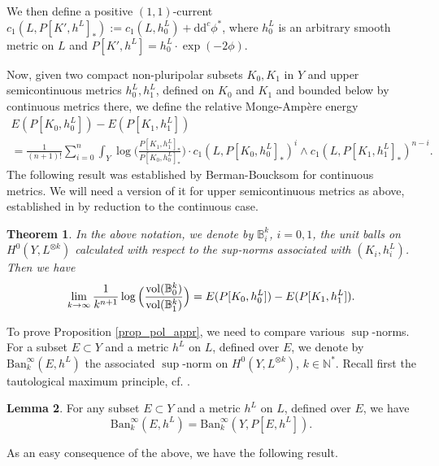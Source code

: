 \documentclass[12pt]{article}
\numberwithin{equation}{section}
\theoremstyle{theorem}
\newtheorem{thm}{Theorem}[section]
\theoremstyle{definition}
\newtheorem{lem}[thm]{Lemma}
\theoremstyle{remark}
\newcommand{\nat}{\mathbb{N}}
\newcommand{\ddc}{\mathrm{d} \mathrm{d}^c}
\begin{document}
	We then define a positive $(1, 1)$-current $c_1(L, P[K', h^L]_*) := c_1(L, h^L_0) + \ddc \phi^*$, where $h^L_0$ is an arbitrary smooth metric on $L$ and $P[K', h^L] = h^L_0 \cdot \exp(- 2 \phi)$.
	\par 
	Now, given two compact non-pluripolar subsets $K_0, K_1$ in $Y$ and upper semicontinuous metrics $h^L_0, h^L_1$, defined on $K_0$ and $K_1$ and bounded below by continuous metrics there, we define the relative Monge-Ampère energy
	\begin{multline}\label{eq_energy_proj}
		E(P[K_0, h^L_0]) - E(P[K_1, h^L_1])
		\\
		=
		\frac{1}{(n + 1)!}
		\sum_{i = 0}^{n} \int_Y \log \Big( \frac{P[K_1, h^L_1]_*}{P[K_0, h^L_0]_*} \Big)
		 \cdot c_1(L, P[K_0, h^L_0]_*)^i \wedge c_1(L, P[K_1, h^L_1]_*)^{n - i}.
	\end{multline}
	The following result was established by Berman-Boucksom \cite{BermanBouckBalls} for continuous metrics.
	We will need a version of it for upper semicontinuous metrics as above, established in \cite[Lemma 4.7]{FinKIDim} by reduction to the continuous case.
	\begin{thm}\label{thm_ber_bouck_balls}
		In the above notation, we denote by $\mathbb{B}^k_i$, $i = 0, 1$, the unit balls on $H^0(Y, L^{\otimes k})$ calculated with respect to the sup-norms associated with $(K_i, h^L_i)$.
		Then we have 
		\begin{equation}
			\lim_{k \to \infty} \frac{1}{k^{n + 1}}  \log \Big( \frac{{\rm{vol}}(\mathbb{B}^k_0)}{{\rm{vol}}(\mathbb{B}^k_1)} \Big)
			=
			E(P[K_0, h^L_0]) - E(P[K_1, h^L_1]).
		\end{equation}
	\end{thm}
	\par 
	To prove Proposition \ref{prop_pol_appr}, we need to compare various $\sup$-norms.
	For a subset $E \subset Y$ and a metric $h^L$ on $L$, defined over $E$, we denote by $\textrm{Ban}_k^{\infty}(E, h^L)$ the associated $\sup$-norm on $H^0(Y, L^{\otimes k})$, $k \in \nat^*$.
	Recall first the tautological maximum principle, cf. \cite[Proposition 1.8]{BermanBouckBalls}.
	\begin{lem}\label{lem_taut_max}
		For any subset 	$E \subset Y$ and a metric $h^L$ on $L$, defined over $E$, we have
		\begin{equation}
				\textrm{Ban}_k^{\infty}(E, h^L)
				=
				\textrm{Ban}_k^{\infty}(Y, P[E, h^L]).
		\end{equation}
	\end{lem}
	As an easy consequence of the above, we have the following result.
\end{document}
